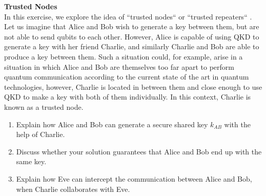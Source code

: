 \begin{exercises}
\item {\bf Trusted Nodes}\\
In this exercise, we explore the idea of ``trusted nodes`` or ``trusted repeaters`` . Let us imagine that Alice and Bob wish to generate a key between them, but are not able to send qubits to each other.
However, Alice is capable of using QKD to generate a key with her friend Charlie, and similarly Charlie and Bob are able to produce a key between them. Such a situation could, for example, arise in a situation in which Alice and Bob are themselves too far apart to perform quantum communication according to the current state of the art in quantum technologies, however, Charlie is located in between them and close enough to use QKD to make a key with both of them individually. In this context, Charlie is known as a trusted node. 
\begin{enumerate}
\item Explain how Alice and Bob can generate a secure shared key $k_{AB}$ with the help of Charlie. 
\item Discuss whether your solution guarantees that Alice and Bob end up with the same key.
\item Explain how Eve can intercept the communication between Alice and Bob, when Charlie collaborates with Eve. 
\end{enumerate}




\end{exercises}
